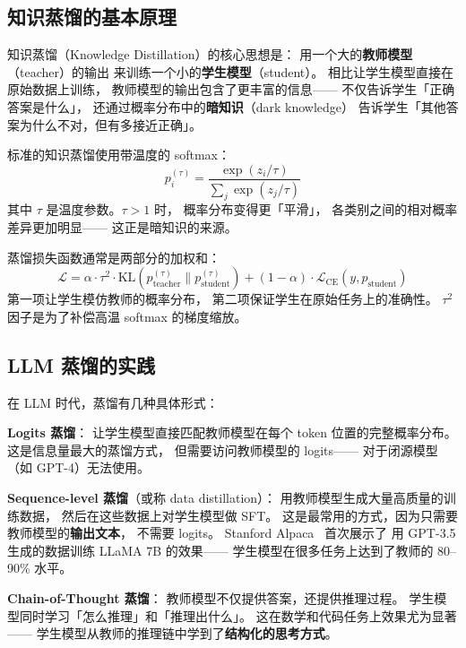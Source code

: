\subsection{知识蒸馏的基本原理}

知识蒸馏（Knowledge Distillation）的核心思想是：
用一个大的\textbf{教师模型}（teacher）的输出
来训练一个小的\textbf{学生模型}（student）。
相比让学生模型直接在原始数据上训练，
教师模型的输出包含了更丰富的信息——
不仅告诉学生「正确答案是什么」，
还通过概率分布中的\textbf{暗知识}（dark knowledge）
告诉学生「其他答案为什么不对，但有多接近正确」。

标准的知识蒸馏使用带温度的 softmax：
\begin{equation}
  p_i^{(\tau)} = \frac{\exp(z_i / \tau)}{\sum_j \exp(z_j / \tau)}
\end{equation}
其中 $\tau$ 是温度参数。$\tau > 1$ 时，
概率分布变得更「平滑」，
各类别之间的相对概率差异更加明显——
这正是暗知识的来源。

蒸馏损失函数通常是两部分的加权和：
\begin{equation}
  \mathcal{L} = \alpha \cdot \tau^2 \cdot \mathrm{KL}(p_{\text{teacher}}^{(\tau)} \| p_{\text{student}}^{(\tau)})
  + (1 - \alpha) \cdot \mathcal{L}_{\text{CE}}(y, p_{\text{student}})
\end{equation}
第一项让学生模仿教师的概率分布，
第二项保证学生在原始任务上的准确性。
$\tau^2$ 因子是为了补偿高温 softmax 的梯度缩放。

\subsection{LLM 蒸馏的实践}

在 LLM 时代，蒸馏有几种具体形式：

\textbf{Logits 蒸馏}：
让学生模型直接匹配教师模型在每个 token 位置的完整概率分布。
这是信息量最大的蒸馏方式，
但需要访问教师模型的 logits——
对于闭源模型（如 GPT-4）无法使用。

\textbf{Sequence-level 蒸馏}（或称 data distillation）：
用教师模型生成大量高质量的训练数据，
然后在这些数据上对学生模型做 SFT。
这是最常用的方式，因为只需要教师模型的\textbf{输出文本}，
不需要 logits。
Stanford Alpaca~\cite{taori2023alpaca} 首次展示了
用 GPT-3.5 生成的数据训练 LLaMA 7B 的效果——
学生模型在很多任务上达到了教师的 80--90\% 水平。

\textbf{Chain-of-Thought 蒸馏}：
教师模型不仅提供答案，还提供推理过程。
学生模型同时学习「怎么推理」和「推理出什么」。
这在数学和代码任务上效果尤为显著——
学生模型从教师的推理链中学到了\textbf{结构化的思考方式}。

